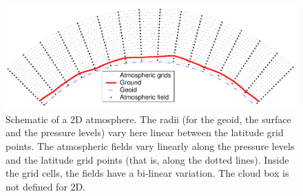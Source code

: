 \begin{figure}[!t]
 \begin{center}
  \includegraphics*[width=0.98\hsize]{atm_dim_2d}
  \caption{Schematic of a 2D atmosphere. The radii (for the geoid, the surface
    and the pressure levels) vary here linear between the latitude
    grid points. The atmospheric fields vary linearly along the
    pressure levels and the latitude grid points (that is, along the
    dotted lines). Inside the grid cells, the fields have a bi-linear
    variation. The cloud box is not defined for 2D.  }
 \end{center}
\end{figure}


